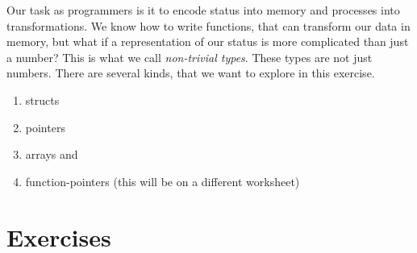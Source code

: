 \documentclass{dcbl/challenge}
\begin{document}
Our task as programmers is it to encode status into memory and processes into transformations.
We know how to write functions, that can transform our data in memory, but what if a representation of our status is more complicated than just a number?
This is what we call \textit{non-trivial types}.
These types are not just numbers. 
There are several kinds, that we want to explore in this exercise.
\begin{enumerate}
    \item structs
    \item pointers
    \item arrays and
    \item function-pointers (this will be on a different worksheet)
\end{enumerate}

\section*{Exercises}
\end{document}
